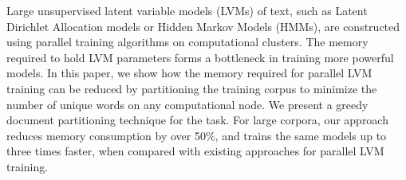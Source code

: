 Large unsupervised latent variable models (LVMs) of text, such as Latent Dirichlet Allocation models or Hidden Markov Models (HMMs), are constructed
 using parallel training algorithms on computational clusters. The memory
 required to hold LVM parameters forms a bottleneck in training more powerful
 models.  In this paper, we show how the memory required for parallel LVM
 training can be reduced by partitioning the training corpus to minimize the
 number of unique words on any computational node. We present a greedy
 document partitioning technique for the task. For large corpora, our approach
 reduces memory consumption by over 50\%, and trains the same models up to three
 times faster, when compared with existing approaches for parallel LVM training.

